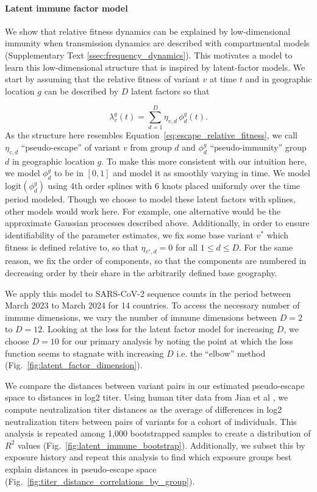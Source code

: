 \documentclass[11pt,oneside,letterpaper]{article}
\newcommand{\varEscape}{\eta}
\begin{document}
\paragraph{Latent immune factor model}

We show that relative fitness dynamics can be explained by low-dimensional immunity when transmission dynamics are described with compartmental models (Supplementary Text \ref{ssec:frequency_dynamics}).
This motivates a model to learn this low-dimensional structure that is inspired by latent-factor models.
We start by assuming that the relative fitness of variant $v$ at time $t$ and in geographic location $g$ can be described by $D$ latent factors so that

\begin{equation}
    \lambda_{v}^{g}(t) = \sum_{d=1}^{D} \varEscape_{v,d} \, \phi_{d}^{g}(t).
\end{equation}
As the structure here resembles Equation~\ref{eq:escape_relative_fitness}, we call $\varEscape_{v,d}$ ``pseudo-escape'' of variant $v$ from group $d$ and $\phi_{d}^{g}$ ``pseudo-immunity'' group $d$ in geographic location $g$.
To make this more consistent with our intuition here, we model $\phi_{d}^{g}$ to be in $[0,1]$ and model it as smoothly varying in time.
We model $\text{logit}(\phi_{d}^{g})$ using 4th order splines with 6 knots placed uniformly over the time period modeled.
Though we choose to model these latent factors with splines, other models would work here.
For example, one alternative would be the approximate Gaussian processes described above.
Additionally, in order to ensure identifiability of the parameter estimates, we fix some base variant $v^*$ which fitness is defined relative to, so that $\varEscape_{v^*, d} = 0$ for all $1\leq d\leq D$.
For the same reason, we fix the order of components, so that the components are numbered in decreasing order by their share in the arbitrarily defined base geography.

We apply this model to SARS-CoV-2 sequence counts in the period between March 2023 to March 2024 for 14 countries.
To access the necessary number of immune dimensions, we vary the number of immune dimensions between $D=2$ to $D=12$.
Looking at the loss for the latent factor model for increasing $D$, we choose $D=10$ for our primary analysis by noting the point at which the loss function seems to stagnate with increasing $D$ i.e. the ``elbow'' method (Fig.~\ref{fig:latent_factor_dimension}).

We compare the distances between variant pairs in our estimated pseudo-escape space to distances in log2 titer.
Using human titer data from Jian et al \cite{Jian2023}, we compute neutralization titer distances as the average of differences in log2 neutralization titers between pairs of variants for a cohort of individuals.
This analysis is repeated among 1,000 bootstrapped samples to create a distribution of $R^2$ values (Fig.~\ref{fig:latent_immune_bootstrap}).
Additionally, we subset this by exposure history and repeat this analysis to find which exposure groups best explain distances in pseudo-escape space (Fig.~\ref{fig:titer_distance_correlations_by_group}).
\end{document}
